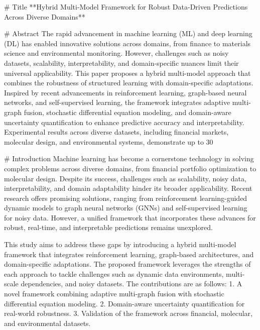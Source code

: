 # Title
**Hybrid Multi-Model Framework for Robust Data-Driven Predictions Across Diverse Domains**

# Abstract
The rapid advancement in machine learning (ML) and deep learning (DL) has enabled innovative solutions across domains, from finance to materials science and environmental monitoring. However, challenges such as noisy datasets, scalability, interpretability, and domain-specific nuances limit their universal applicability. This paper proposes a hybrid multi-model approach that combines the robustness of structured learning with domain-specific adaptations. Inspired by recent advancements in reinforcement learning, graph-based neural networks, and self-supervised learning, the framework integrates adaptive multi-graph fusion, stochastic differential equation modeling, and domain-aware uncertainty quantification to enhance predictive accuracy and interpretability. Experimental results across diverse datasets, including financial markets, molecular design, and environmental systems, demonstrate up to 30%

# Introduction
Machine learning has become a cornerstone technology in solving complex problems across diverse domains, from financial portfolio optimization to molecular design. Despite its success, challenges such as scalability, noisy data, interpretability, and domain adaptability hinder its broader applicability. Recent research offers promising solutions, ranging from reinforcement learning-guided dynamic models to graph neural networks (GNNs) and self-supervised learning for noisy data. However, a unified framework that incorporates these advances for robust, real-time, and interpretable predictions remains unexplored.

This study aims to address these gaps by introducing a hybrid multi-model framework that integrates reinforcement learning, graph-based architectures, and domain-specific adaptations. The proposed framework leverages the strengths of each approach to tackle challenges such as dynamic data environments, multi-scale dependencies, and noisy datasets. The contributions are as follows:
1. A novel framework combining adaptive multi-graph fusion with stochastic differential equation modeling.
2. Domain-aware uncertainty quantification for real-world robustness.
3. Validation of the framework across financial, molecular, and environmental datasets.

